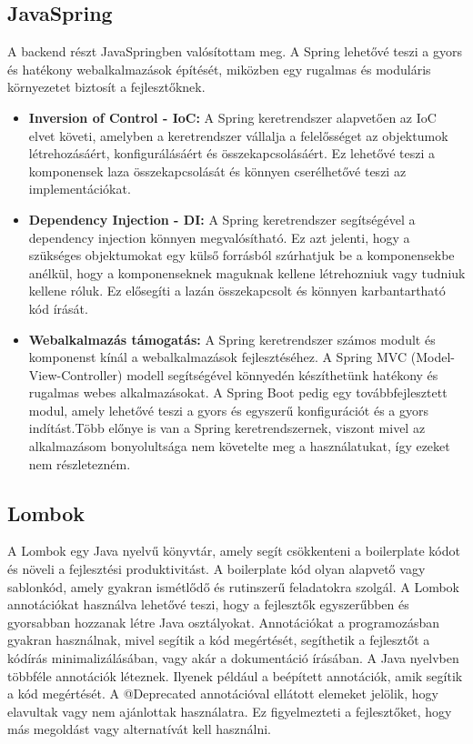 \documentclass[a4paper,twoside]{article}
\begin{document}
\subsection{JavaSpring}
A backend részt JavaSpringben\cite{javaspring} valósítottam meg. A Spring lehetővé teszi a gyors és hatékony
webalkalmazások építését, miközben egy rugalmas és moduláris környezetet biztosít a
fejlesztőknek.
\begin{itemize}
	\item  \textbf{Inversion of Control - IoC:} A Spring keretrendszer alapvetően az IoC elvet követi,
	amelyben a keretrendszer vállalja a felelősséget az objektumok létrehozásáért,
	konfigurálásáért és összekapcsolásáért. Ez lehetővé teszi a komponensek laza
	összekapcsolását és könnyen cserélhetővé teszi az implementációkat.
	\item \textbf{Dependency Injection - DI:} A Spring keretrendszer segítségével a dependency
	injection könnyen megvalósítható. Ez azt jelenti, hogy a szükséges objektumokat egy
	külső forrásból szúrhatjuk be a komponensekbe anélkül, hogy a komponenseknek
	maguknak kellene létrehozniuk vagy tudniuk kellene róluk. Ez elősegíti a lazán
	összekapcsolt és könnyen karbantartható kód írását.
	\item \textbf{Webalkalmazás támogatás:} A Spring keretrendszer számos modult és komponenst
	kínál a webalkalmazások fejlesztéséhez. A Spring MVC (Model-View-Controller)
	modell segítségével könnyedén készíthetünk hatékony és rugalmas webes
	alkalmazásokat. A Spring Boot pedig egy továbbfejlesztett modul, amely lehetővé
	teszi a gyors és egyszerű konfigurációt és a gyors indítást.Több előnye is van a Spring
	keretrendszernek, viszont mivel az alkalmazásom bonyolultsága nem követelte meg a
	használatukat, így ezeket nem részletezném.
\end{itemize}

\subsection{Lombok}
A Lombok\cite{lombok}  egy Java nyelvű könyvtár, amely
segít csökkenteni a boilerplate kódot és növeli a fejlesztési produktivitást. A boilerplate kód olyan alapvető vagy sablonkód, amely gyakran
ismétlődő és rutinszerű feladatokra szolgál. A Lombok annotációkat használva lehetővé teszi, hogy a fejlesztők egyszerűbben és gyorsabban hozzanak létre Java osztályokat. Annotációkat a programozásban gyakran használnak, mivel segítik a kód megértését, segíthetik a fejlesztőt a kódírás minimalizálásában, vagy akár a
dokumentáció írásában. A Java nyelvben többféle annotációk léteznek. Ilyenek például a beépített annotációk, amik segítik a kód
megértését. A @Deprecated annotációval ellátott elemeket jelölik, hogy elavultak vagy nem ajánlottak használatra. Ez figyelmezteti a fejlesztőket, hogy más megoldást vagy alternatívát kell használni.
\end{document}
